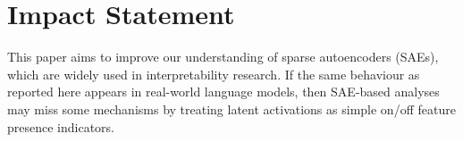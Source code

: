 \section*{Impact Statement}




This paper aims to improve our understanding of sparse autoencoders (SAEs), which are widely used in interpretability research. If the same behaviour as reported here appears in real-world language models, then SAE-based analyses may miss some mechanisms by treating latent activations as simple on/off feature presence indicators.
